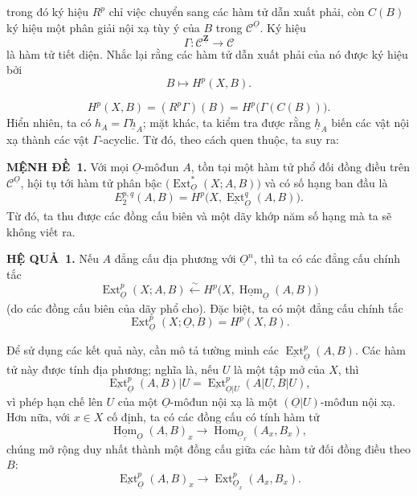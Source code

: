 \documentclass[11pt,twoside,openany]{book}
\numberwithin{equation}{section}
\newcommand{\src}[1]{%
  \phantomsection\hypertarget{src:\fgasourceid:#1}{}%
  \marginpar{\raggedleft\footnotesize\sffamily #1}%
}
\newcommand{\fgasourceid}{unset}
\newcommand{\Osh}{\underline{O}}
\newcommand{\Zsh}{\underline{\mathbf Z}}
\newcommand{\Ccat}{\mathcal C}
\newcommand{\Homsh}{\underline{\operatorname{Hom}}}
\newcommand{\Extsh}{\underline{\operatorname{Ext}}}
\newcommand{\hsh}{\underline{h}}
\newcommand{\fquote}[1]{\textquotedbl#1\textquotedbl}
\newcommand{\result}[2]{\par\medskip\noindent\textbf{#1\if\relax\detokenize{#2}\relax\else\ #2\fi.}\quad}
\begin{document}
trong đó ký hiệu $R^{p}$ chỉ việc chuyển sang các hàm tử dẫn xuất phải, còn
$C(B)$ ký hiệu một phân giải nội xạ tùy ý của $B$ trong $\Ccat^{\Osh}$.
Ký hiệu
\[
  \Gamma:\Ccat^{\Zsh}\longrightarrow\Ccat
\]
là hàm tử \fquote{tiết diện}. Nhắc lại rằng các hàm tử dẫn xuất phải của nó được
ký hiệu bởi
\[
  B\longmapsto H^{p}(X,B).
\]


\src{170}
\begin{equation}\tag{1.3}
  H^{p}(X,B)=(R^{p}\Gamma)(B)=H^{p}\bigl(\Gamma(C(B))\bigr).
\end{equation}
Hiển nhiên, ta có $h_A=\Gamma\hsh_A$; mặt khác, ta kiểm tra được rằng $\hsh_A$
biến các vật nội xạ thành các vật $\Gamma$-acyclic. Từ đó, theo cách quen thuộc,
ta suy ra:

\result{MỆNH ĐỀ}{1} Với mọi $\Osh$-môđun $A$, tồn tại một hàm tử
phổ đối đồng điều trên $\Ccat^{\Osh}$, hội tụ tới hàm tử phân bậc
$\bigl(\operatorname{Ext}_{\Osh}^{*}(X;A,B)\bigr)$ và có số hạng ban đầu là
\begin{equation}\tag{1.4}
  E_{2}^{p,q}(A,B)=H^{p}\bigl(X,\Extsh_{\Osh}^{q}(A,B)\bigr).
\end{equation}
Từ đó, ta thu được các \fquote{đồng cấu biên} và một dãy khớp năm số hạng
mà ta sẽ không viết ra.

\result{HỆ QUẢ}{1} Nếu $A$ đẳng cấu địa phương với $\Osh^{n}$, thì ta có
các đẳng cấu chính tắc
\begin{equation}\tag{1.5}
  \operatorname{Ext}_{\Osh}^{p}(X;A,B)
  \overset{\sim}{\longleftarrow}
  H^{p}\bigl(X,\Homsh_{\Osh}(A,B)\bigr)
\end{equation}
(do các đồng cấu biên của dãy phổ cho). Đặc biệt, ta có
một đẳng cấu chính tắc
\begin{equation}\tag{1.6}
  \operatorname{Ext}_{\Osh}^{p}(X;\Osh,B)=H^{p}(X,B).
\end{equation}

Để sử dụng các kết quả này, cần mô tả tường minh các
$\Extsh_{\Osh}^{p}(A,B)$. Các hàm tử này được tính địa phương;
nghĩa là, nếu $U$ là một tập mở của $X$, thì
\[
  \Extsh_{\Osh}^{p}(A,B)|U
  =\Extsh_{\Osh|U}^{p}(A|U,B|U),
\]
vì phép hạn chế lên $U$ của một $\Osh$-môđun nội xạ
là một $(\Osh|U)$-môđun nội xạ. Hơn nữa, với $x\in X$ cố định, ta có các đồng cấu có tính hàm tử
\begin{equation}\tag{1.7}
  \Homsh_{\Osh}(A,B)_x
  \longrightarrow
  \operatorname{Hom}_{\Osh_x}(A_x,B_x),
\end{equation}
chúng mở rộng duy nhất thành một đồng cấu giữa các hàm tử đối đồng điều
theo $B$:
\begin{equation}\tag{1.8}
  \Extsh_{\Osh}^{p}(A,B)_x
  \longrightarrow
  \operatorname{Ext}_{\Osh_x}^{p}(A_x,B_x).
\end{equation}
\end{document}
